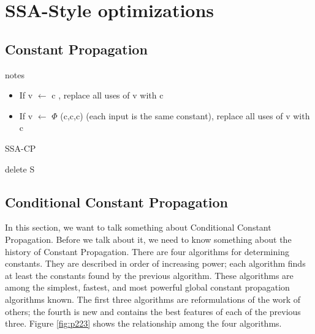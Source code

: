 \newpage

\section{SSA-Style optimizations}

\subsection{Constant Propagation}
\begin{note}{notes}
	\begin{itemize}
		\item If  v $\gets$ c , replace all uses of v with c
		\item If  v $\gets$  $\Phi$ (c,c,c)  (each input is the same constant), replace all uses of v with c
	\end{itemize}
\end{note}


\begin{algorithm}
	\caption{SSA-CP}\label{alg:SSA-CP}
	\begin{algorithmic}

		\State delete S
		\EndFor
		\EndIf
		\EndWhile

	\end{algorithmic}
\end{algorithm}

\subsection{Conditional Constant Propagation }

In this section, we want to talk something about Conditional Constant Propagation. 
Before we talk about it, we need to know something about the history of Constant Propagation.
There are four algorithms for determining constants.
 They are described in order of increasing power; each algorithm finds at least the
constants found by the previous algorithm. These algorithms are among the
simplest, fastest, and most powerful global constant propagation algorithms
known. The first three algorithms are reformulations of the work of others;
the fourth is new and contains the best features of each of the previous three.
Figure \ref{fig:p223} shows the relationship among the four algorithms.


